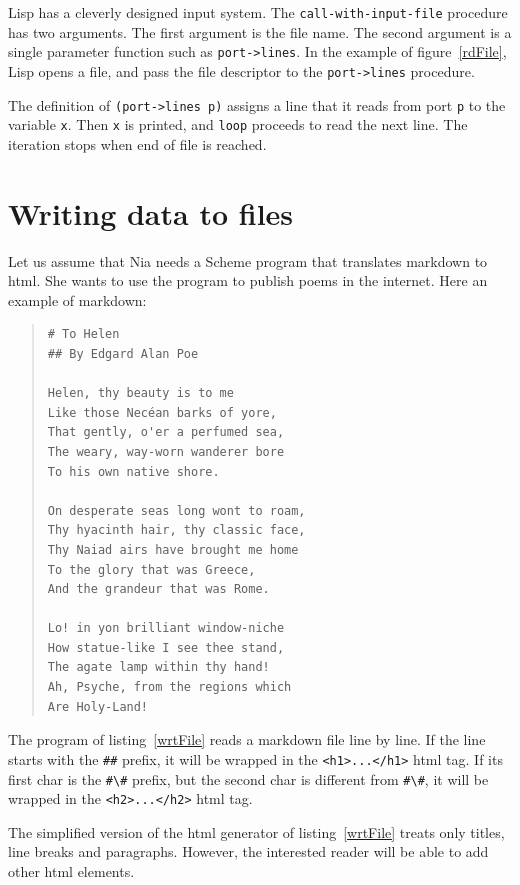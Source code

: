 \documentclass[a4paper,12pt]{book}
\begin{document}
Lisp has a cleverly designed input system.
The  
\verb|call-with-input-file| \label{page:call-with-input-file}
procedure has two arguments. The first
argument is the file name. 
The second argument is
a single parameter function such
as \verb|port->lines|. In the example
of figure~\ref{rdFile}, Lisp 
opens a file, and pass the file descriptor
to the \verb|port->lines| procedure.

The definition of \verb|(port->lines p)| assigns
a line that it reads  from port \verb|p| to the
variable \verb|x|. Then \verb|x| is printed, and
\verb|loop| proceeds to read the next line. The
iteration stops when  end of file is reached.

\section{Writing data to files}
Let us assume that Nia needs 
a Scheme program that translates
markdown to html. She wants to
use the program to publish poems
in the internet. Here an example
of markdown:
\begin{quote}
\begin{verbatim}
# To Helen
## By Edgard Alan Poe

Helen, thy beauty is to me
Like those Necéan barks of yore,
That gently, o'er a perfumed sea,
The weary, way-worn wanderer bore
To his own native shore.

On desperate seas long wont to roam,
Thy hyacinth hair, thy classic face,
Thy Naiad airs have brought me home
To the glory that was Greece,
And the grandeur that was Rome.

Lo! in yon brilliant window-niche 
How statue-like I see thee stand, 
The agate lamp within thy hand! 
Ah, Psyche, from the regions which 
Are Holy-Land! 
\end{verbatim}
\end{quote}

The program of listing~\ref{wrtFile}
reads a markdown file line by line.
If the line starts with the \verb|##| prefix,
it will be wrapped in the \verb|<h1>...</h1>|
html tag. If its first char is the \verb|#\#|
prefix, but the second char is different
from \verb|#\#|, it will be wrapped in
the \verb|<h2>...</h2>| html tag.

The simplified version of the html
generator of listing~\ref{wrtFile} treats
only titles, line breaks and paragraphs.
However, the interested reader will
be able to add other html elements.
\end{document}
